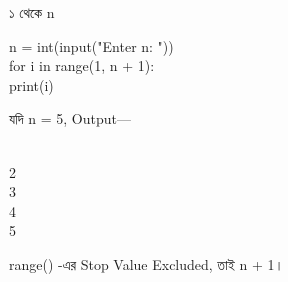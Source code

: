 

\begin{codeoutputbox}{১ থেকে n}

\noindent
\begin{minipage}[t]{0.52\linewidth}
\codeheading

\begin{english}
\ttfamily
n = int(input("Enter n: "))\\[0.5mm]
for i in range(1, n + 1):\\
\hspace*{4mm}print(i)
\end{english}

\end{minipage}
\hfill
\begin{minipage}[t]{0.44\linewidth}
\outputheading

যদি
\textenglish{\ttfamily n = 5},
Output—

\begin{english}
\\
2\\
3\\
4\\
5
\end{english}

\textenglish{\ttfamily range()}
-এর Stop Value Excluded, তাই
\textenglish{\ttfamily n + 1}।

\end{minipage}

\end{codeoutputbox}



